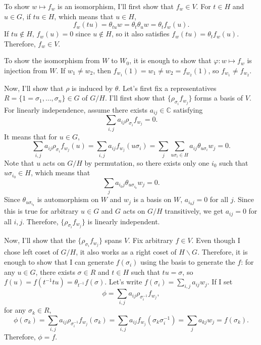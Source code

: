 \documentclass[a4paper, 12pt]{article}
\theoremstyle{Mydefinition}
\theoremstyle{Mytheorem}
\begin{document}
To show $w\mapsto f_w$ is an isomorphism, I'll first show that $f_w\in V$. For $t\in H$ and $u\in G$, if $tu\in H$, which means that $u\in H$,
\begin{equation}
    f_w(tu) = \theta_{tu}w = \theta_t\theta_uw = \theta_tf_w(u).
\end{equation}
If $tu\not\in H$, $f_w(u) = 0$ since $u\not\in H$, so it also satisfies $f_w(tu) = \theta_tf_w(u)$. Therefore, $f_w\in V$.

To show the isomorphism from $W$ to $W_0$, it is enough to show that $\varphi:w\mapsto f_w$ is injection from $W$. If $w_1\neq w_2$, then $f_{w_1}(1)=w_1\neq w_2 = f_{w_2}(1)$, so $f_{w_1}\neq f_{w_2}$.

Now, I'll show that $\rho$ is induced by $\theta$. Let's first fix a representatives $R=\{1=\sigma_1, \ldots, \sigma_n\}\in G$ of $G/H$. I'll first show that $\{\rho_{\sigma_i}f_{w_j}\}$ forms a basis of $V$. For linearly independence, assume there exists $a_{ij}\in\mathbb{C}$ satisfying
\begin{equation}
    \sum_{i,j}a_{ij}\rho_{\sigma_i} f_{w_j} = 0.
\end{equation}
It means that for $u\in G$,
\begin{equation}
    \sum_{i,j}a_{ij}\rho_{\sigma_i} f_{w_j}(u) = \sum_{i,j}a_{ij} f_{w_j}(u\sigma_i) = \sum_j\sum_{u\sigma_i\in H}a_{ij} \theta_{u\sigma_i}w_j = 0.
\end{equation}
Note that $u$ acts on $G/H$ by permutation, so there exists only one $i_0$ such that $u\sigma_{i_0}\in H$, which means that
\begin{equation}
    \sum_ja_{i_0j} \theta_{u\sigma_{i_0}}w_j = 0.
\end{equation}
Since $\theta_{u\sigma_{i_0}}$ is automorphism on $W$ and $w_j$ is a basis on $W$, $a_{i_0j} = 0$ for all $j$. Since this is true for arbitrary $u\in G$ and $G$ acts on $G/H$ transitively, we get $a_{ij}=0$ for all $i,j$. Therefore, $\{\rho_{\sigma_i}f_{w_j}\}$ is linearly independent.

Now, I'll show that the $\{\rho_{\sigma_i}f_{w_j}\}$ spans $V$. Fix arbitrary $f\in V$. Even though I chose left coset of $G/H$, it also works as a right coset of $H\backslash G$. Therefore, it is enough to show that I can generate $f(\sigma_i)$ using the basis to generate the $f$: for any $u\in G$, there exists $\sigma\in R$ and $t\in H$ such that $tu=\sigma$, so $f(u) = f(t^{-1}tu) = \theta_{t^{-1}}f(\sigma)$. Let's write $f(\sigma_i) = \sum_{i,j}a_{ij}w_j$. If I set
\begin{equation}
    \phi = \sum_{i,j}a_{ij}\rho_{\sigma^{-1}_i}f_{w_j},
\end{equation}
for any $\sigma_k\in R$,
\begin{equation}
    \phi(\sigma_k) = \sum_{i,j}a_{ij}\rho_{\sigma^{-1}_i}f_{w_j}(\sigma_k) = \sum_{i,j}a_{ij}f_{w_j}(\sigma_k\sigma^{-1}_i) = \sum_j a_{kj}w_j = f(\sigma_k).
\end{equation}
Therefore, $\phi=f$. 
\end{document}
